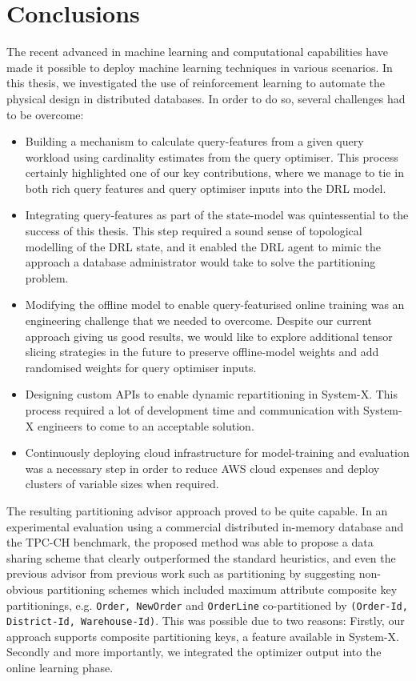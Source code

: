 \chapter{Conclusions}
\label{chapter:conclusion}
The recent advanced in machine learning and computational capabilities have made it possible to deploy machine learning techniques in various scenarios. 
In this thesis, we investigated the use of reinforcement learning to automate the physical design in distributed databases. In order to do so, several challenges had to be overcome:
\begin{itemize}
    \item Building a mechanism to calculate query-features from a given query workload using cardinality estimates from the query optimiser. This process certainly highlighted one of our key contributions, where we manage to tie in both rich query features and query optimiser inputs into the DRL model.
    \item Integrating query-features as part of the state-model was quintessential to the success of this thesis. This step required a sound sense of topological modelling of the DRL state, and it enabled the DRL agent to mimic the approach a database administrator would take to solve the partitioning problem.
    \item Modifying the offline model to enable query-featurised online training was an engineering challenge that we needed to overcome. Despite our current approach giving us good results, we would like to explore additional tensor slicing strategies in the future to preserve offline-model weights and add randomised weights for query optimiser inputs.
    \item Designing custom APIs to enable dynamic repartitioning in System-X. This process required a lot of development time and communication with System-X engineers to come to an acceptable solution.
    \item Continuously deploying cloud infrastructure for model-training and evaluation was a necessary step in order to reduce AWS cloud expenses and deploy clusters of variable sizes when required.
\end{itemize}
 
The resulting partitioning advisor approach proved to be quite capable.
In an experimental evaluation using a commercial distributed in-memory database and the TPC-CH benchmark, the proposed method was able to propose a data sharing scheme that clearly outperformed the standard heuristics, and even the previous advisor from previous work \cite{Hilprecht:2019:TLP:3329859.3329876} such as partitioning by suggesting non-obvious partitioning schemes which included maximum attribute composite key partitionings, e.g. \texttt{Order, NewOrder} and \texttt{OrderLine} co-partitioned by \texttt{(Order-Id,} \texttt{District-Id, Warehouse-Id)}.
This was possible due to two reasons: Firstly, our approach supports composite partitioning keys, a feature available in System-X. Secondly and more importantly, we integrated the optimizer output into the online learning phase.  

